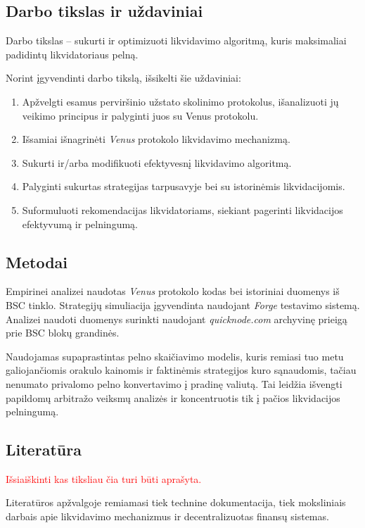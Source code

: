 \documentclass[]{VUMIFTemplateClass}
\begin{document}
\subsection*{Darbo tikslas ir uždaviniai}
Darbo tikslas – sukurti ir optimizuoti likvidavimo algoritmą, kuris maksimaliai padidintų likvidatoriaus pelną.

Norint įgyvendinti darbo tikslą, išsikelti šie uždaviniai:
\begin{enumerate}
    \item Apžvelgti esamus perviršinio užstato skolinimo protokolus, išanalizuoti jų veikimo principus ir palyginti juos su Venus protokolu.
    \item Išsamiai išnagrinėti \textit{Venus} protokolo likvidavimo mechanizmą.
    \item Sukurti ir/arba modifikuoti efektyvesnį likvidavimo algoritmą.
    \item Palyginti sukurtas strategijas tarpusavyje bei su istorinėmis likvidacijomis.
    \item Suformuluoti rekomendacijas likvidatoriams, siekiant pagerinti likvidacijos efektyvumą ir pelningumą.
\end{enumerate}

\subsection*{Metodai}
Empirinei analizei naudotas \textit{Venus} protokolo kodas bei istoriniai duomenys iš BSC tinklo. Strategijų simuliacija įgyvendinta naudojant \textit{Forge} testavimo sistemą. Analizei naudoti duomenys surinkti naudojant \textit{quicknode.com} archyvinę prieigą prie BSC blokų grandinės.

Naudojamas supaprastintas pelno skaičiavimo modelis, kuris remiasi tuo metu galiojančiomis orakulo kainomis ir faktinėmis strategijos kuro sąnaudomis, tačiau nenumato privalomo pelno konvertavimo į pradinę valiutą. Tai leidžia išvengti papildomų arbitražo veiksmų analizės ir koncentruotis tik į pačios likvidacijos pelningumą.

\subsection*{Literatūra}
\textcolor{red}{
Išsiaiškinti kas tiksliau čia turi būti aprašyta.
}

Literatūros apžvalgoje remiamasi tiek technine dokumentacija, tiek moksliniais darbais apie likvidavimo mechanizmus ir decentralizuotas finansų sistemas.
\end{document}

